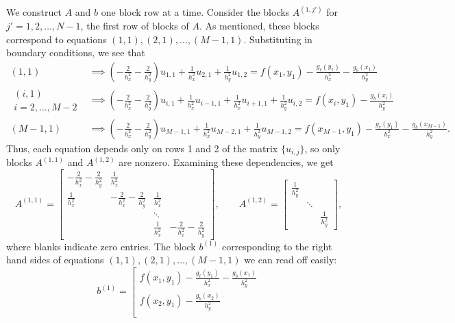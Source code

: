 \documentclass{homework}
\begin{document}
\begin{alphaparts}
		We construct $A$ and $b$ one block row at a time. Consider the blocks $A^{(1,j')}$ for $j'=1,2,\dots, N-1$, the first row of blocks of $A$. As mentioned, these blocks correspond to equations $(1,1),(2,1), \dots, (M-1,1)$. Substituting in boundary conditions, we see that
		\begin{align*}
			(1,1) &\implies \left(-\frac{2}{h_x^2}-\frac{2}{h_y^2}\right)u_{1,1} + \frac{1}{h_x^2}u_{2,1} + \frac{1}{h_y^2}u_{1,2} = f(x_1,y_1) - \frac{g_\ell(y_1)}{h_x^2} - \frac{g_b(x_1)}{h_y^2} \\
			\substack{(i,1) \\ i=2,\dots,M-2} &\implies \left(-\frac{2}{h_x^2}-\frac{2}{h_y^2}\right)u_{i,1} + \frac{1}{h_x^2}u_{i-1,1} + \frac{1}{h_x^2}u_{i+1,1} + \frac{1}{h_y^2}u_{i,2} = f(x_i,y_1) - \frac{g_b(x_i)}{h_y^2} \\
			(M-1,1) &\implies \left(-\frac{2}{h_x^2}-\frac{2}{h_y^2}\right)u_{M-1,1} + \frac{1}{h_x^2}u_{M-2,1} + \frac{1}{h_y^2}u_{M-1,2} = f(x_{M-1}, y_1) - \frac{g_r(y_1)}{h_x^2} - \frac{g_b(x_{M-1})}{h_y^2}.
		\end{align*}
		Thus, each equation depends only on rows 1 and 2 of the matrix $\{u_{i,j}\}$, so only blocks $A^{(1,1)}$ and $A^{(1,2)}$ are nonzero. Examining these dependencies, we get
		\begin{equation*}
			A^{(1,1)} = \left[\begin{matrix}
				-\frac{2}{h_x^2}-\frac{2}{h_y^2} & \frac{1}{h_x^2} \\
				\frac{1}{h_x^2} & -\frac{2}{h_x^2}-\frac{2}{h_y^2} & \frac{1}{h_x^2} \\
				& & \ddots \\
				& & \frac{1}{h_x^2} & -\frac{2}{h_x^2}-\frac{2}{h_y^2}
			\end{matrix}\right], \qquad
			A^{(1,2)} = \left[\begin{matrix}\frac{1}{h_y^2} \\ & \ddots \\ & & \frac{1}{h_y^2} \end{matrix}\right],
		\end{equation*}
		where blanks indicate zero entries. The block $b^{(1)}$ corresponding to the right hand sides of equations $(1,1),(2,1), \dots, (M-1,1)$ we can read off easily:
		\begin{equation*}
			b^{(1)} = \left[\begin{matrix}
				f(x_1,y_1) - \frac{g_\ell(y_1)}{h_x^2} - \frac{g_b(x_1)}{h_y^2} \\
				f(x_2,y_1) - \frac{g_b(x_2)}{h_y^2} \\

\end{matrix}
\end{equation*}
\end{alphaparts}
\end{document}
